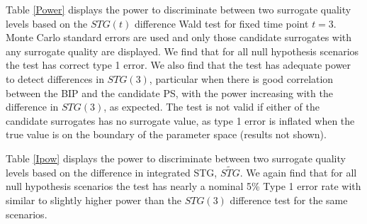 \documentclass[times, doublespace]{simauth}
\begin{document}
Table \ref{Power} displays the power to discriminate between two surrogate quality levels based on the $STG(t)$ difference Wald test for fixed time point $t=3$. Monte Carlo standard errors are used and only those candidate surrogates with any surrogate quality are displayed. We find that for all null hypothesis scenarios the test has correct type 1 error. We also find that the test has adequate power to detect differences in $STG(3)$, particular when there is good correlation between the BIP and the candidate PS, with the power increasing with the difference in $STG(3)$, as expected. The test is not valid if either of the candidate surrogates has no surrogate value, as type 1 error is inflated when the true value is on the boundary of the parameter space (results not shown). 

Table \ref{Ipow} displays the power to discriminate between two surrogate quality levels based on the difference in integrated STG, $\widetilde{STG}$. We again find that for all null hypothesis scenarios the test has nearly a nominal 5\% Type 1 error rate with similar to slightly higher power than the $STG(3)$ difference test for the same scenarios. 
\end{document}
